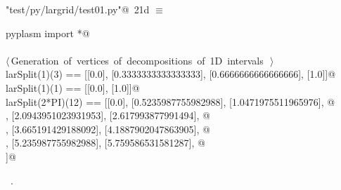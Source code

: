 \documentclass[11pt,oneside]{article}	%
\begin{document}
\begin{flushleft} \small \label{scrap37}
\protect{}\verb@"test/py/largrid/test01.py"@\nobreak\ {\footnotesize 21d }$\equiv$
\vspace{-1ex}
\begin{list}{}{} \item
\mbox{}\verb@from pyplasm import *@\\
\mbox{}\verb@@\\
\mbox{}\verb@@\hbox{$\langle\,$Generation of vertices of decompositions of 1D intervals\nobreak\ {\footnotesize {}}$\,\rangle$}\verb@@\\
\mbox{}\verb@assert larSplit(1)(3) == [[0.0], [0.3333333333333333], [0.6666666666666666], [1.0]]@\\
\mbox{}\verb@assert larSplit(1)(1) == [[0.0], [1.0]]@\\
\mbox{}\verb@assert larSplit(2*PI)(12) == [[0.0], [0.5235987755982988], [1.0471975511965976], @\\
\mbox{}\verb@[1.5707963267948966], [2.0943951023931953], [2.617993877991494], @\\
\mbox{}\verb@[3.141592653589793], [3.665191429188092], [4.1887902047863905], @\\
\mbox{}\verb@[4.71238898038469], [5.235987755982988], [5.759586531581287], @\\
\mbox{}\verb@[6.283185307179586]]@\\
\mbox{}\verb@@{\NWsep}
\end{list}
\vspace{-1ex}
\footnotesize\addtolength{\baselineskip}{-1ex}
\begin{list}{}{\setlength{\itemsep}{-\parsep}\setlength{\itemindent}{-\leftmargin}}
\item \NWtxtFileDefBy\ .
\end{list}
\end{flushleft}
\end{document}
